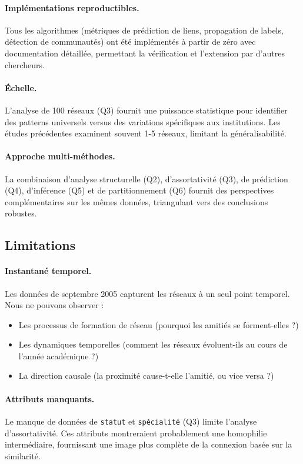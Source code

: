 \documentclass[12pt,a4paper]{article}
\begin{document}
\paragraph{Implémentations reproductibles.} Tous les algorithmes (métriques de prédiction de liens, propagation de labels, détection de communautés) ont été implémentés à partir de zéro avec documentation détaillée, permettant la vérification et l'extension par d'autres chercheurs.

\paragraph{Échelle.} L'analyse de 100 réseaux (Q3) fournit une puissance statistique pour identifier des patterns universels versus des variations spécifiques aux institutions. Les études précédentes examinent souvent 1-5 réseaux, limitant la généralisabilité.

\paragraph{Approche multi-méthodes.} La combinaison d'analyse structurelle (Q2), d'assortativité (Q3), de prédiction (Q4), d'inférence (Q5) et de partitionnement (Q6) fournit des perspectives complémentaires sur les mêmes données, triangulant vers des conclusions robustes.

\subsection{Limitations}

\paragraph{Instantané temporel.} Les données de septembre 2005 capturent les réseaux à un seul point temporel. Nous ne pouvons observer :
\begin{itemize}
    \item Les processus de formation de réseau (pourquoi les amitiés se forment-elles ?)
    \item Les dynamiques temporelles (comment les réseaux évoluent-ils au cours de l'année académique ?)
    \item La direction causale (la proximité cause-t-elle l'amitié, ou vice versa ?)
\end{itemize}

\paragraph{Attributs manquants.} Le manque de données de \texttt{statut} et \texttt{spécialité} (Q3) limite l'analyse d'assortativité. Ces attributs montreraient probablement une homophilie intermédiaire, fournissant une image plus complète de la connexion basée sur la similarité.
\end{document}
